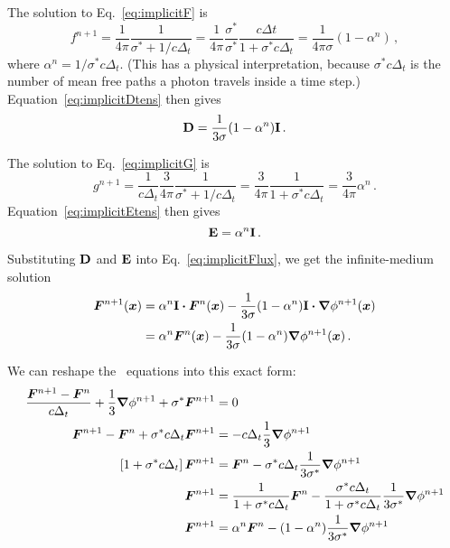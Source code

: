 The solution to Eq.~\eqref{eq:implicitF} is
\begin{equation*}
  f^{n+1}
  = \frac{1}{4\pi} \frac{1}{\sigma^\ast + 1 /c \Delta_t}
  = \frac{1}{4\pi} \frac{\sigma^\ast}{\sigma^\ast} \frac{c \Delta t}{1 + \sigma^\ast c \Delta_t}
  = \frac{1}{4\pi \sigma} ( 1 - \alpha^n) \,,
\end{equation*}
where $\alpha^n = 1/ \sigma^\ast c \Delta_t$. (This has a physical
interpretation, because $\sigma^\ast c \Delta_t$ is the number of mean free
paths a photon travels inside a time step.) Equation~\eqref{eq:implicitDtens}
then gives
\begin{equation*}
  \mathbf{D} = \frac{1}{3 \sigma} ( 1 - \alpha^n) \mathbf{I}\,.
\end{equation*}

The solution to Eq.~\eqref{eq:implicitG} is
\begin{equation*}
  g^{n+1}
  = \frac{1}{c \Delta_t} \frac{3}{4\pi} \frac{1}{\sigma^\ast + 1 /c \Delta_t}
  = \frac{3}{4\pi} \frac{1}{1 + \sigma^\ast c \Delta_t}
  = \frac{3}{4\pi} \alpha^n \,.
\end{equation*}
Equation~\eqref{eq:implicitEtens} then gives
\begin{equation*}
  \mathbf{E} = \alpha^n \mathbf{I}\,.
\end{equation*}

Substituting $\mathbf{D}$ and $\mathbf{E}$ into Eq.~\eqref{eq:implicitFlux}, we get the
infinite-medium solution
\begin{align*}
  \bm{F}^{n+1}(\bm{x})
  &= \alpha^n \mathbf{I} \bm{\cdot} \bm{F}^n(\bm{x})
  - \frac{1}{3 \sigma} ( 1 - \alpha^n) \mathbf{I} \bm{\cdot} \bm{\nabla} \phi^{n+1} (\bm{x}) 
  \\
  &= \alpha^n \bm{F}^n(\bm{x})
  - \frac{1}{3 \sigma} ( 1 - \alpha^n) \bm{\nabla} \phi^{n+1} (\bm{x})\,.
\end{align*}

We can reshape the \Pone\ equations into this exact form:
\begin{align*}
  \frac{\bm{F}^{n+1} - \bm{F}^n}{c \Delta_t} + \frac{1}{3} \bm{\nabla} \phi^{n+1}
  + \sigma^\ast \bm{F}^{n+1} &= 0
  \\
  \bm{F}^{n+1} - \bm{F}^n 
  + \sigma^\ast c \Delta_t \bm{F}^{n+1}
  &= - c \Delta_t \frac{1}{3} \bm{\nabla} \phi^{n+1}
  \\
  \left[ 1 + \sigma^\ast c \Delta_t \right] \bm{F}^{n+1}
  &= \bm{F}^n - \sigma^\ast c \Delta_t \frac{1}{3\sigma^\ast} \bm{\nabla} \phi^{n+1}
  \\
  \bm{F}^{n+1}
  &= \frac{1}{1 + \sigma^\ast c \Delta_t} \bm{F}^n - \frac{\sigma^\ast c
  \Delta_t}{1 + \sigma^\ast c \Delta_t} \frac{1}{3\sigma^\ast} \bm{\nabla} \phi^{n+1}
  \\
  \bm{F}^{n+1}
  &= \alpha^n \bm{F}^n - (1 - \alpha^n) \frac{1}{3\sigma^\ast} \bm{\nabla} \phi^{n+1}
\end{align*}

